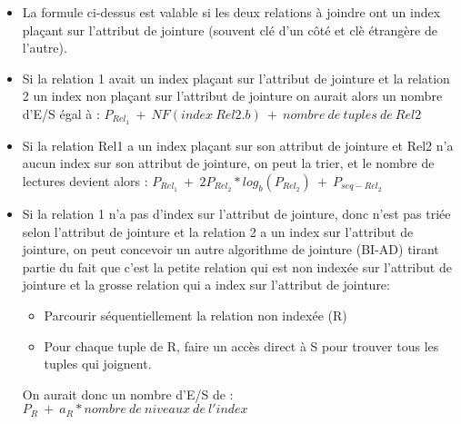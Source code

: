 \documentclass[11pt]{article}
\begin{document}
\begin{itemize}
\item La formule ci-dessus est valable si les deux relations à joindre ont un index plaçant sur l'attribut de jointure (souvent clé d'un côté et clè étrangère de l'autre).
\item Si la relation 1 avait un index plaçant sur l'attribut de jointure et la relation 2 un index non plaçant sur l'attribut de jointure on aurait alors un nombre d'E/S égal à : $\boxed{P_{Rel_1}~+~NF(index~Rel2.b)~+~nombre~de~tuples~de~Rel2}$
\item Si la relation Rel1 a un index plaçant sur son attribut de jointure et Rel2 n'a aucun index sur son attribut de jointure, on peut la trier, et le nombre de lectures devient alors : $\boxed{P_{Rel_1}~+~2P_{Rel_2}*log_b(P_{Rel_2})~+~P_{seq-Rel_2}}$
\item Si la relation 1 n'a pas d'index sur l'attribut de jointure, donc n'est pas triée selon l'attribut de jointure et la relation 2 a un index sur l'attribut de jointure, on peut concevoir un autre algorithme de jointure (BI-AD) tirant partie du fait que c'est la petite relation qui est non indexée sur l'attribut de jointure et la grosse relation qui a index sur l'attribut de jointure: 
\begin{itemize}
\item Parcourir séquentiellement la relation non indexée (R)
\item Pour chaque tuple de R, faire un accès direct à S pour trouver tous les tuples qui joignent.
\end{itemize}
On aurait donc un nombre d'E/S de : $\boxed{P_{R}~+~a_{R}*nombre~de~niveaux~de~l'index}$
\end{itemize}
\end{document}
